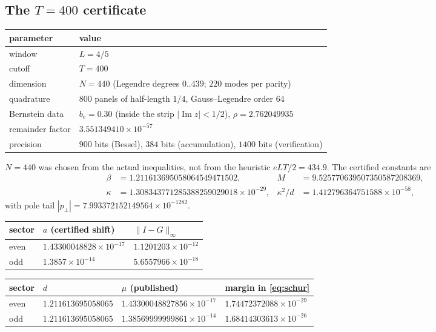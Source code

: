 \documentclass[11pt,a4paper]{article}
\theoremstyle{definition}
\theoremstyle{remark}
\begin{document}
\subsection{The $T = 400$ certificate}

\begin{center}
\begin{tabular}{ll}
\toprule
parameter & value \\
\midrule
window & $L = 4/5$ \\
cutoff & $T = 400$ \\
dimension & $N = 440$ (Legendre degrees $0..439$; $220$ modes per parity) \\
quadrature & $800$ panels of half-length $1/4$, Gauss--Legendre order $64$ \\
Bernstein data & $b_e = 0.30$ (inside the strip $|\operatorname{Im} z| < 1/2$), $\rho = 2.762049935$ \\
remainder factor & $3.551349410\times10^{-57}$ \\
precision & $900$ bits (Bessel), $384$ bits (accumulation), $1400$ bits (verification) \\
\bottomrule
\end{tabular}
\end{center}

$N = 440$ was chosen from the actual inequalities, not from the heuristic
$eLT/2 = 434.9$. The certified constants are
\begin{align*}
  \beta &= 1.211613695058064549471502, &
  M &= 9.525770639507350587208369, \\
  \kappa &= 1.308343771285388259029018\times10^{-29}, &
  \kappa^2/d &= 1.412796364751588\times10^{-58},
\end{align*}
with pole tail $|p_{\perp}| = 7.993372152149564\times10^{-1282}$.

\begin{center}
\begin{tabular}{lll}
\toprule
sector & $a$ (certified shift) & $\|I-G\|_{\infty}$ \\
\midrule
even & $1.43300048828\times10^{-17}$ & $1.1201203\times10^{-12}$ \\
odd  & $1.3857\times10^{-14}$        & $5.6557966\times10^{-18}$ \\
\bottomrule
\end{tabular}

\medskip
\begin{tabular}{llll}
\toprule
sector & $d$ & $\mu$ (published) & margin in \eqref{eq:schur} \\
\midrule
even & $1.211613695058065$ & $1.43300048827856\times10^{-17}$ & $1.74472372088\times10^{-29}$ \\
odd  & $1.211613695058065$ & $1.38569999999861\times10^{-14}$ & $1.68414303613\times10^{-26}$ \\
\bottomrule
\end{tabular}
\end{center}
\end{document}
